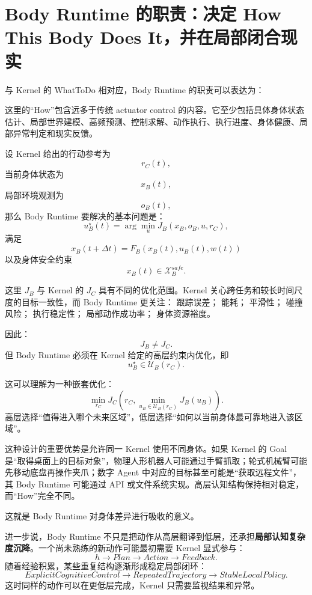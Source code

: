 \section{Body Runtime 的职责：决定 How This Body Does It，并在局部闭合现实}

与 Kernel 的 WhatToDo 相对应，Body Runtime 的职责可以表达为：
\begin{statementbox}
\centering
{}
\end{statementbox}
这里的“How”包含远多于传统 actuator control 的内容。它至少包括具体身体状态估计、局部世界建模、高频预测、控制求解、动作执行、执行进度、身体健康、局部异常判定和现实反馈。

设 Kernel 给出的行动参考为
\[
r_C(t),
\]
当前身体状态为
\[
x_B(t),
\]
局部环境观测为
\[
o_B(t),
\]
那么 Body Runtime 要解决的基本问题是：
\[
u_B^\star(t)
=
\arg\min_{u}
J_B
\left(
x_B,
o_B,
u,
r_C
\right),
\]
满足
\[
x_B(t+\Delta t)
=
F_B
\left(
x_B(t),
u_B(t),
w(t)
\right)
\]
以及身体安全约束
\[
x_B(t)\in\mathcal X_B^{safe}.
\]

这里 $J_B$ 与 Kernel 的 $J_C$ 具有不同的优化范围。Kernel 关心跨任务和较长时间尺度的目标一致性，而 Body Runtime 更关注：
跟踪误差；
能耗；
平滑性；
碰撞风险；
执行稳定性；
局部动作成功率；
身体资源裕度。

因此：
\[
J_B
\neq
J_C.
\]
但 Body Runtime 必须在 Kernel 给定的高层约束内优化，即
\[
u_B^\star
\in
\mathcal U_B(r_C).
\]

这可以理解为一种嵌套优化：
\[
\boxed{
\min_{r_C}
J_C
\left(
r_C,
\min_{u_B\in \mathcal U_B(r_C)}
J_B(u_B)
\right).
}
\]
高层选择“值得进入哪个未来区域”，低层选择“如何以当前身体最可靠地进入该区域”。

这种设计的重要优势是允许同一 Kernel 使用不同身体。如果 Kernel 的 Goal 是“取得桌面上的目标对象”，物理人形机器人可能通过手臂抓取；轮式机械臂可能先移动底盘再操作夹爪；数字 Agent 中对应的目标甚至可能是“获取远程文件”，其 Body Runtime 可能通过 API 或文件系统实现。高层认知结构保持相对稳定，而“How”完全不同。

这就是 Body Runtime 对身体差异进行吸收的意义。

进一步说，Body Runtime 不只是把动作从高层翻译到低层，还承担\textbf{局部认知复杂度沉降}。一个尚未熟练的新动作可能最初需要 Kernel 显式参与：
\[
h
\rightarrow
Plan
\rightarrow
Action
\rightarrow
Feedback.
\]
随着经验积累，某些重复结构逐渐形成稳定局部闭环：
\[
ExplicitCognitiveControl
\rightarrow
RepeatedTrajectory
\rightarrow
StableLocalPolicy.
\]
这时同样的动作可以在更低层完成，Kernel 只需要监视结果和异常。


